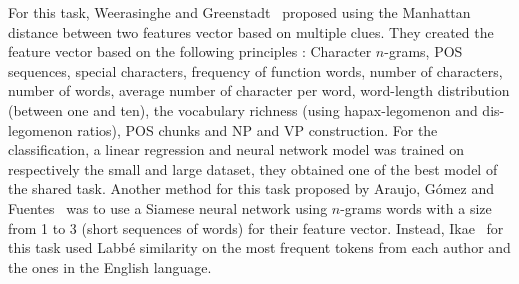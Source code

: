 For this task, Weerasinghe and Greenstadt~\cite{feature_vector_pan20} proposed using the Manhattan distance between two features vector based on multiple clues.
They created the feature vector based on the following principles : Character $n$-grams, POS sequences, special characters, frequency of function words, number of characters, number of words, average number of character per word, word-length distribution (between one and ten), the vocabulary richness (using hapax-legomenon and dis-legomenon ratios), POS chunks and NP and VP construction.
For the classification, a linear regression and neural network model was trained on respectively the small and large dataset, they obtained one of the best model of the shared task.
Another method for this task proposed by Araujo, Gómez and Fuentes~\cite{siamese_network_pan20} was to use a Siamese neural network using $n$-grams words with a size from 1 to 3 (short sequences of words) for their feature vector.
Instead, Ikae~\cite{unine_pan20_verif} for this task used Labbé similarity on the most frequent tokens from each author and the ones in the English language.
